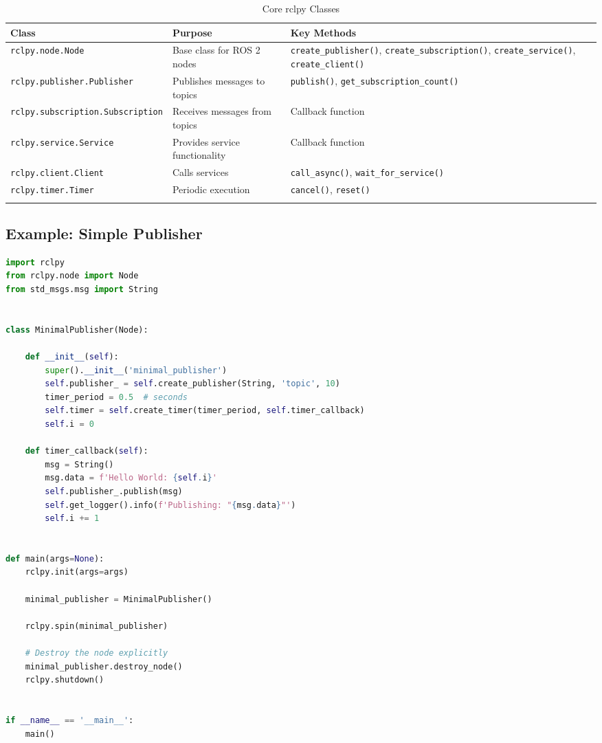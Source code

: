 \documentclass[a4paper,12pt]{book}
\newcommand{\code}[1]{\texttt{#1}}
\begin{document}
\begin{longtable}{|p{3cm}|p{4cm}|p{7cm}|}
\hline
\textbf{Class} & \textbf{Purpose} & \textbf{Key Methods} \\
\hline
\endhead
\code{rclpy.node.Node} & Base class for ROS 2 nodes & \code{create\_publisher()}, \code{create\_subscription()}, \code{create\_service()}, \code{create\_client()} \\
\hline
\code{rclpy.publisher.Publisher} & Publishes messages to topics & \code{publish()}, \code{get\_subscription\_count()} \\
\hline
\code{rclpy.subscription.Subscription} & Receives messages from topics & Callback function \\
\hline
\code{rclpy.service.Service} & Provides service functionality & Callback function \\
\hline
\code{rclpy.client.Client} & Calls services & \code{call\_async()}, \code{wait\_for\_service()} \\
\hline
\code{rclpy.timer.Timer} & Periodic execution & \code{cancel()}, \code{reset()} \\
\hline
\caption{Core rclpy Classes}
\label{tab:rclpy_classes}
\end{longtable}

\subsection{Example: Simple Publisher}

\begin{lstlisting}[language=Python, caption=Simple Publisher in Python]
import rclpy
from rclpy.node import Node
from std_msgs.msg import String


class MinimalPublisher(Node):

    def __init__(self):
        super().__init__('minimal_publisher')
        self.publisher_ = self.create_publisher(String, 'topic', 10)
        timer_period = 0.5  # seconds
        self.timer = self.create_timer(timer_period, self.timer_callback)
        self.i = 0

    def timer_callback(self):
        msg = String()
        msg.data = f'Hello World: {self.i}'
        self.publisher_.publish(msg)
        self.get_logger().info(f'Publishing: "{msg.data}"')
        self.i += 1


def main(args=None):
    rclpy.init(args=args)
    
    minimal_publisher = MinimalPublisher()
    
    rclpy.spin(minimal_publisher)
    
    # Destroy the node explicitly
    minimal_publisher.destroy_node()
    rclpy.shutdown()


if __name__ == '__main__':
    main()
\end{lstlisting}
\end{document}
